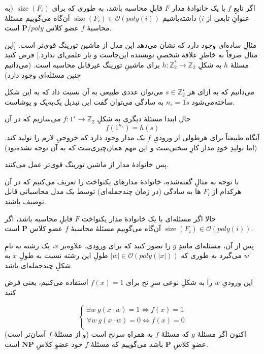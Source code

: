 \documentclass[a4paper,12pt]{article}
\DeclareMathOperator{\size}{size}
\renewcommand{\O}[1]{\mathcal{O}(#1)}
\begin{document}
اگر تابعِ \(f\) با یک خانوادهٔ مدار \(F\) قابلِ محاسبه باشد، به طوری که برای
\(\size(F_i)\)
(به عنوانِ تابعی از \(i\)) داشته‌باشیم
\(\size(F_i) \in \mathcal{O}(poly(i))\)
آن‌گاه می‌گوییم مسئلهٔ محاسبهٔ \(f\) عضو کلاس 
\(\mathbf{P}/poly\)
است.

مثالِ ساده‌ای وجود دارد که نشان می‌دهد این مدل از ماشین تورینگ قوی‌تر است.
[این مثال صرفاً به خاطرِ علاقهٔ شخصیِ نویسنده این‌جاست و بار علمی‌ای ندارد.]
فرض کنید مسئلهٔ \(h\) به شکلِ 
\( h: \mathbb{Z}_2^* \to \mathbb{Z}_2\)
برای ماشینِ تورینگ غیرقابل محاسبه است. (می‌دانیم چنین مسئله‌ای وجود دارد)

می‌دانیم که به ازای هر 
\(s \in \mathbb{Z}_2^\star\)
می‌توان عددی طبیعی به آن نسبت داد که به این شکل ساخته‌می‌شود
\(n_s = \overline{1 s}\)
به سادگی می‌توان گفت این تبدیل یک‌به‌یک و پوشاست.

حال ابتدا مسئلهٔ دیگری به شکلِ 
\(f: 1^\star \to \mathbb{Z}_2 \)
می‌سازیم که در آن 
\begin{equation} f(1^{n_s}) = h(s) \end{equation}
آنگاه طبیعتاً برای هرطولی از ورودیِ \(f\) یک مدار وجود دارد که خروجیِ لازم را تولید کند. (اما تولیدِ خودِ مدار کارِ سختی‌ست و این مهم همان‌چیزی‌ست که به آن توجه نشده‌بود)

پس خانوادهٔ مدار از ماشین تورینگ قوی‌تر عمل می‌کنند. 

با توجه به مثالِ گفته‌شده، خانوادهٔ مدارهای یکنواخت را تعریف می‌کنیم که در آن هرکدام از
\(F_i\)
ها به سادگی (در زمان چندجمله‌ای) توسط یک مدل محاسباتی قابل توصیف باشند.

حالا اگر مسئله‌ای با یک خانوادهٔ مدار یکنواخت \(F\) قابلِ محاسبه باشد، اگر
\(\size(F_i) \in \O{poly(i)}\)
آن‌گاه می‌گوییم مسئلهٔ محاسبهٔ \(f\) عضو کلاس 
\(\mathbf{P}\)
است.
 
پس از آن، مسئله‌ای مانندِ \(g\) را تصور کنید که برای ورودی، علاوه‌بر \(x\)، یک رشته به نامِ \(w\) می‌گیرد به طوری که 
\(
    |w| \in \O{poly(|x|)}
\)
طولِ این رشته نسبت به طولِ \(x\) به شکلِ چندجمله‌ای باشد.


این ورودیِ \(w\) را به شکلِ نوعی سرِ نخ برای \(f(x)=1\) استفاده می‌کنیم، یعنی فرض کنید

\begin{equation}
    \begin{cases}
    \exists w ~ g(x \cdot w) = 1 \Leftrightarrow f(x) = 1 \\
    \forall w ~ g(x \cdot w) = 0 \Leftrightarrow f(x) = 0 \\
    \end{cases}
\end{equation} 
اکنون اگر مسئلهٔ \(g\) که مسئلهٔ \(f\) به همراهِ سرنخ است (و از مسئلهٔ \(f\) آسان‌تر است) عضوِ کلاسِ 
\( \mathbf{P} \)
باشد می‌گوییم که مسئلهٔ \(f\) خود عضوِ کلاسِ
\( \mathbf{NP} \)
است.
\end{document}
